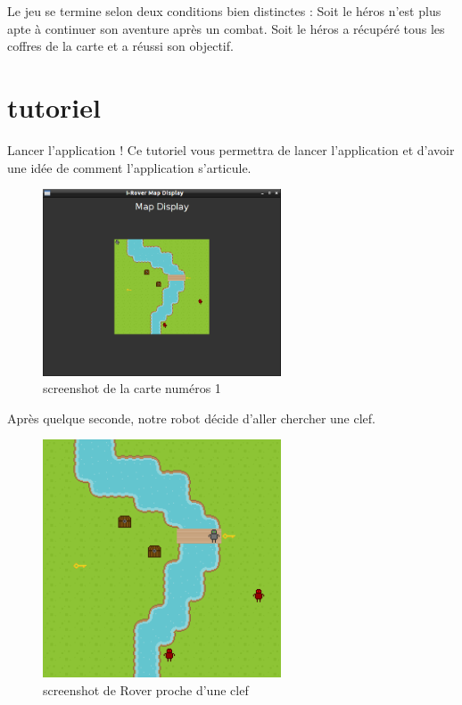 \documentclass[a4paper 12pts]{article}
\begin{document}
Le jeu se termine selon deux conditions bien distinctes :
Soit le héros n'est plus apte à continuer son aventure après un combat.
Soit le héros a récupéré tous les coffres de la carte et a réussi son objectif.

\newpage

\section{tutoriel}
\vspace{0.55cm}

Lancer l'application !
Ce tutoriel vous permettra de lancer l'application et d'avoir une idée de comment l'application s'articule.

\vspace{0.25cm}
\begin{figure}[h]
   \includegraphics[width=200pt]{Illustration/screens/screen1.png}
	\caption{screenshot de la carte numéros 1}
\end{figure}

Après quelque seconde, notre robot décide d'aller chercher une clef.

\begin{figure}[h]
   \includegraphics[width=200pt]{Illustration/screens/screen2.png}
\caption{screenshot de Rover proche d'une clef}
\end{figure}
\end{document}
